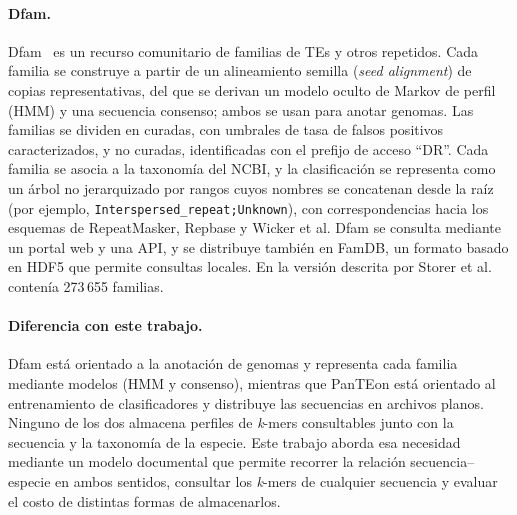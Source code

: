 \paragraph{Dfam.}
Dfam~\cite{storer2021dfam} es un recurso comunitario de familias de TEs
y otros repetidos. Cada familia se construye a partir de un alineamiento
semilla (\textit{seed alignment}) de copias representativas, del que se
derivan un modelo oculto de Markov de perfil (HMM) y una secuencia
consenso; ambos se usan para anotar genomas. Las familias se dividen en
curadas, con umbrales de tasa de falsos positivos caracterizados, y no
curadas, identificadas con el prefijo de acceso ``DR''. Cada familia se
asocia a la taxonomía del NCBI, y la clasificación se representa como
un árbol no jerarquizado por rangos cuyos nombres se concatenan desde la
raíz (por ejemplo, \texttt{Interspersed\_repeat;Unknown}), con
correspondencias hacia los esquemas de RepeatMasker, Repbase y Wicker
et al. Dfam se consulta mediante un portal web y una API, y se
distribuye también en FamDB, un formato basado en HDF5 que permite
consultas locales. En la versión descrita por Storer et
al.~\cite{storer2021dfam} contenía 273\,655 familias.

\paragraph{Diferencia con este trabajo.}
Dfam está orientado a la anotación de genomas y representa cada familia
mediante modelos (HMM y consenso), mientras que PanTEon está orientado
al entrenamiento de clasificadores y distribuye las secuencias en
archivos planos. Ninguno de los dos almacena perfiles de \textit{k}-mers
consultables junto con la secuencia y la taxonomía de la especie. Este
trabajo aborda esa necesidad mediante un modelo documental que permite
recorrer la relación secuencia--especie en ambos sentidos, consultar
los \textit{k}-mers de cualquier secuencia y evaluar el costo de
distintas formas de almacenarlos.